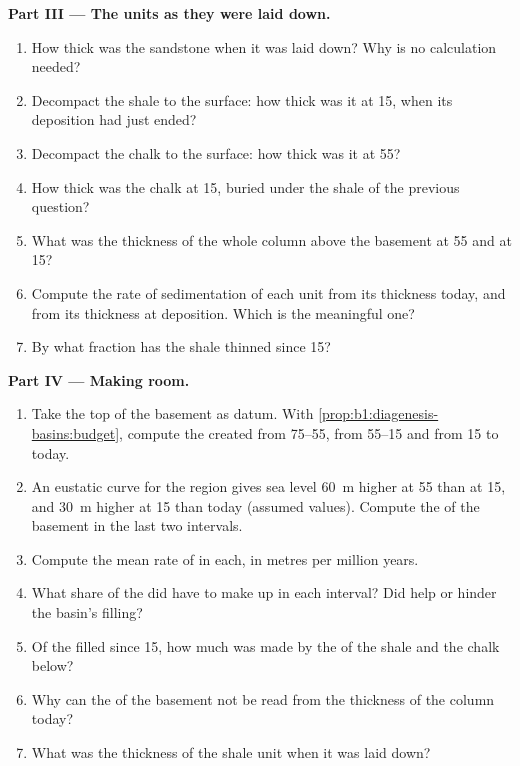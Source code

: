 \begin{problem}
\noindent\textbf{Part III --- The units as they were laid down.}
\begin{enumerate}[resume]
  \item How thick was the sandstone when it was laid down? Why is no
        calculation needed?
  \item Decompact the shale to the surface: how thick was it at \qty{15}{\Ma},
        when its deposition had just ended?
  \item Decompact the chalk to the surface: how thick was it at \qty{55}{\Ma}?
  \item How thick was the chalk at \qty{15}{\Ma}, buried under the shale of the
        previous question?
  \item What was the thickness of the whole column above the basement at
        \qty{55}{\Ma} and at \qty{15}{\Ma}?
  \item Compute the rate of sedimentation of each unit from its thickness
        today, and from its thickness at deposition. Which is the meaningful
        one?
  \item By what fraction has the shale thinned since \qty{15}{\Ma}?
\end{enumerate}

\noindent\textbf{Part IV --- Making room.}
\begin{enumerate}[resume]
  \item Take the top of the basement as datum. With
        \cref{prop:b1:diagenesis-basins:budget}, compute the 
        created from \qtyrange{75}{55}{\Ma}, from \qtyrange{55}{15}{\Ma} and
        from \qty{15}{\Ma} to today.
  \item An eustatic curve for the region gives sea level \qty{60}{m} higher at
        \qty{55}{\Ma} than at \qty{15}{\Ma}, and \qty{30}{m} higher at
        \qty{15}{\Ma} than today (assumed values). Compute the  of
        the basement in the last two intervals.
  \item Compute the mean rate of  in each, in metres per million
        years.
  \item What share of the  did  have to make up in each
        interval? Did  help or hinder the basin's filling?
  \item Of the  filled since \qty{15}{\Ma}, how much was made by the
         of the shale and the chalk below?
  \item Why can the  of the basement not be read from the thickness
        of the column today?
  \item What was the thickness of the shale unit when it was laid down?
\end{enumerate}
\end{problem}
